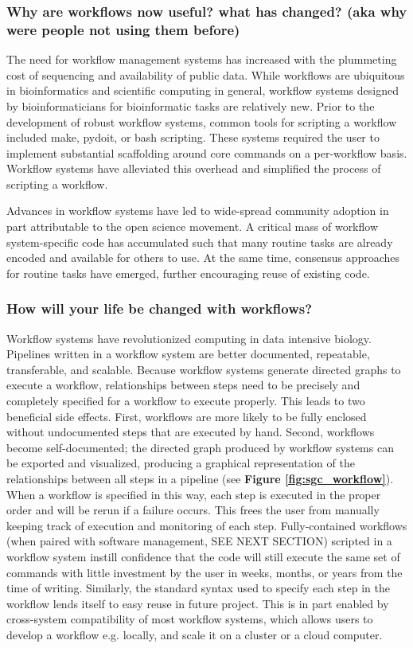 \documentclass[10pt,letterpaper]{article}
\begin{document}
\subsubsection*{Why are workflows now useful? what has changed? (aka why were people not using them before)}
 
The need for workflow management systems has increased with the plummeting cost of sequencing and availability of public data.
While workflows are ubiquitous in bioinformatics and scientific computing in general, workflow systems designed by bioinformaticians for bioinformatic tasks are relatively new. 
Prior to the development of robust workflow systems, common tools for scripting a workflow included make, pydoit, or bash scripting. 
These systems required the user to implement substantial scaffolding around core commands on a per-workflow basis. 
Workflow systems have alleviated this overhead and simplified the process of scripting a workflow.

Advances in workflow systems have led to wide-spread community adoption in part attributable to the open science movement. 
A critical mass of workflow system-specific code has accumulated such that many routine tasks are already encoded and available for others to use.
At the same time, consensus approaches for routine tasks have emerged, further encouraging reuse of existing code.

\subsubsection*{How will your life be changed with workflows?}

Workflow systems have revolutionized computing in data intensive biology.
Pipelines written in a workflow system are better documented, repeatable, transferable, and scalable. 
Because workflow systems generate directed graphs to execute a workflow, relationships between steps need to be precisely and completely specified for a workflow to execute properly.
This leads to two beneficial side effects. 
First, workflows are more likely to be fully enclosed without undocumented steps that are executed by hand. 
Second, workflows become self-documented; the directed graph produced by workflow systems can be exported and visualized, producing a graphical representation of the relationships between all steps in a pipeline (see \textbf{Figure \ref{fig:sgc_workflow}}).
When a workflow is specified in this way, each step is executed in the proper order and will be rerun if a failure occurs. 
This frees the user from manually keeping track of execution and monitoring of each step.
Fully-contained workflows (when paired with software management, SEE NEXT SECTION) scripted in a workflow system instill confidence that the code will still execute the same set of commands with little investment by the user in weeks, months, or years from the time of writing.
Similarly, the standard syntax used to specify each step in the workflow lends itself to easy reuse in future project. 
This is in part enabled by cross-system compatibility of most workflow systems, which allows users to develop a workflow e.g. locally, and scale it on a cluster or a cloud computer.
\end{document}
